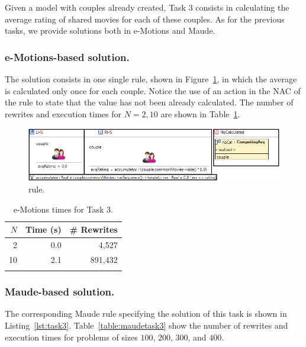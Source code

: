 
Given a model with couples already created, Task 3 consists in calculating the average rating of shared movies for each of these couples. As for the previous tasks, we provide solutions both in e-Motions and Maude. 

\subsubsection{e-Motions-based solution.}

The solution consists in one single rule, shown in Figure~\ref{fig:computingAvgRating}, in which the average is calculated only once for each couple. Notice the use of an action in the NAC of the rule to state that the value has not been already calculated. The number of rewrites and execution times for $N=2, 10$ are shown in Table~\ref{table:emotionstask3}.

\begin{figure}[htp]
  \centering
  \includegraphics[width=\textwidth]{imgs/computingAvgRating}
  \caption{ rule.}\label{fig:computingAvgRating}
\end{figure}

\begin{table}[tb]
\renewcommand{\tabcolsep}{6pt}
\renewcommand{\arraystretch}{1.2}
    \centering
	\begin{tabular}{r r r}
	$N$ & Time (s) & \# Rewrites \\
	\hline
	2 & 0.0 & 4,527 \\
	10 & 2.1 & 891,432 \\
	\hline \\
	\end{tabular}
	\caption{e-Motions times for Task 3.}\label{table:emotionstask3}
\end{table}

\subsubsection{Maude-based solution.}
The corresponding Maude rule specifying the solution of this task is shown in Listing~\ref{lst:task3}. Table~\ref{table:maudetask3} show the number of rewrites and execution times for problems of sizes $100$, $200$, $300$, and $400$.

